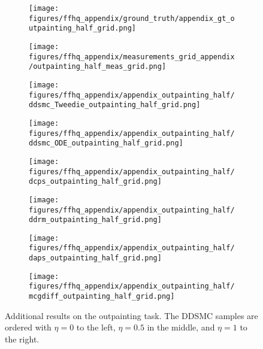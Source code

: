 \begin{figure*}[h!]
    \centering
    \begin{subfigure}[t]{0.083\linewidth}
        \centering
        \texttt{[image: figures/ffhq\_appendix/ground\_truth/appendix\_gt\_outpainting\_half\_grid.png]}
    \end{subfigure}%
    \hfill
    \begin{subfigure}[t]{0.083\linewidth}
        \centering
        \texttt{[image: figures/ffhq\_appendix/measurements\_grid\_appendix/outpainting\_half\_meas\_grid.png]}
    \end{subfigure}%
    \hfill
    \begin{subfigure}[t]{0.25\linewidth}
        \centering
        \texttt{[image: figures/ffhq\_appendix/appendix\_outpainting\_half/ddsmc\_Tweedie\_outpainting\_half\_grid.png]}
    \end{subfigure}%
    \hfill
    \begin{subfigure}[t]{0.25\linewidth}
        \centering
        \texttt{[image: figures/ffhq\_appendix/appendix\_outpainting\_half/ddsmc\_ODE\_outpainting\_half\_grid.png]}
    \end{subfigure}%
    \hfill
    \begin{subfigure}[t]{0.083\linewidth}
        \centering
        \texttt{[image: figures/ffhq\_appendix/appendix\_outpainting\_half/dcps\_outpainting\_half\_grid.png]}
    \end{subfigure}%
    \begin{subfigure}[t]{0.083\linewidth}
        \centering
        \texttt{[image: figures/ffhq\_appendix/appendix\_outpainting\_half/ddrm\_outpainting\_half\_grid.png]}
    \end{subfigure}%
    \begin{subfigure}[t]{0.083\linewidth}
        \centering
        \texttt{[image: figures/ffhq\_appendix/appendix\_outpainting\_half/daps\_outpainting\_half\_grid.png]}
    \end{subfigure}%
    \begin{subfigure}[t]{0.083\linewidth}
        \centering
        \texttt{[image: figures/ffhq\_appendix/appendix\_outpainting\_half/mcgdiff\_outpainting\_half\_grid.png]}
    \end{subfigure}%
\caption{Additional results on the outpainting task. The DDSMC samples are ordered with $\eta=0$ to the left, $\eta=0.5$ in the middle, and $\eta=1$ to the right. }
\label{fig:ffhq_appendix_outpainting_half}
\end{figure*}
